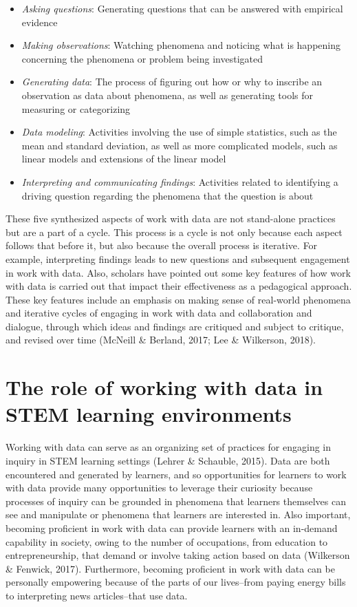 \documentclass[]{msu-thesis}
\providecommand{\tightlist}{%
  \setlength{\itemsep}{0pt}\setlength{\parskip}{0pt}}
\theoremstyle{definition}
\theoremstyle{definition}
\theoremstyle{definition}
\theoremstyle{remark}
\begin{document}
\begin{itemize}
\tightlist
\item
  \emph{Asking questions}: Generating questions that can be answered
  with empirical evidence
\item
  \emph{Making observations}: Watching phenomena and noticing what is
  happening concerning the phenomena or problem being investigated
\item
  \emph{Generating data}: The process of figuring out how or why to
  inscribe an observation as data about phenomena, as well as generating
  tools for measuring or categorizing
\item
  \emph{Data modeling}: Activities involving the use of simple
  statistics, such as the mean and standard deviation, as well as more
  complicated models, such as linear models and extensions of the linear
  model
\item
  \emph{Interpreting and communicating findings}: Activities related to
  identifying a driving question regarding the phenomena that the
  question is about
\end{itemize}

These five synthesized aspects of work with data are not stand-alone
practices but are a part of a cycle. This process is a cycle is not only
because each aspect follows that before it, but also because the overall
process is iterative. For example, interpreting findings leads to new
questions and subsequent engagement in work with data. Also, scholars
have pointed out some key features of how work with data is carried out
that impact their effectiveness as a pedagogical approach. These key
features include an emphasis on making sense of real-world phenomena and
iterative cycles of engaging in work with data and collaboration and
dialogue, through which ideas and findings are critiqued and subject to
critique, and revised over time (McNeill \& Berland, 2017; Lee \&
Wilkerson, 2018).

\section{The role of working with data in STEM learning
environments}\label{the-role-of-working-with-data-in-stem-learning-environments}

Working with data can serve as an organizing set of practices for
engaging in inquiry in STEM learning settings (Lehrer \& Schauble,
2015). Data are both encountered and generated by learners, and so
opportunities for learners to work with data provide many opportunities
to leverage their curiosity because processes of inquiry can be grounded
in phenomena that learners themselves can see and manipulate or
phenomena that learners are interested in. Also important, becoming
proficient in work with data can provide learners with an in-demand
capability in society, owing to the number of occupations, from
education to entrepreneurship, that demand or involve taking action
based on data (Wilkerson \& Fenwick, 2017). Furthermore, becoming
proficient in work with data can be personally empowering because of the
parts of our lives--from paying energy bills to interpreting news
articles--that use data.
\end{document}
